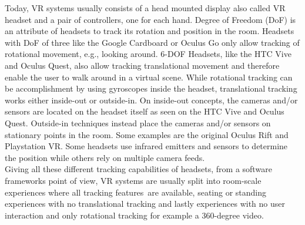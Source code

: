 Today, VR systems usually consists of a head mounted display also called VR headset and a pair of controllers, one for each hand. 
Degree of Freedom (DoF) is an attribute of headsets to track its rotation and position in the room. Headsets with DoF of three like the Google Cardboard or Oculus Go only allow tracking of rotational movement, e.g., looking around. 6-DOF Headsets, like the HTC Vive and Oculus Quest, also allow tracking translational movement and therefore enable the user to walk around in a virtual scene. 
While rotational tracking can be accomplishment by using gyroscopes inside the headset, translational tracking works either inside-out or outside-in. On inside-out concepts, the cameras and/or sensors are located on the headset itself as seen on the HTC Vive and Oculus Quest. Outside-in techniques instead place the cameras and/or sensors on stationary points in the room. Some examples are the original Oculus Rift and Playstation VR.
Some headsets use infrared emitters and sensors to determine the position while others rely on multiple camera feeds.\\
Giving all these different tracking capabilities of headsets, from a software frameworks point of view, VR systems are usually split into room-scale \label{exp:vr-experience}experiences where all tracking features are available, seating or standing experiences with no translational tracking and lastly experiences with no user interaction and only rotational tracking for example a 360-degree video.